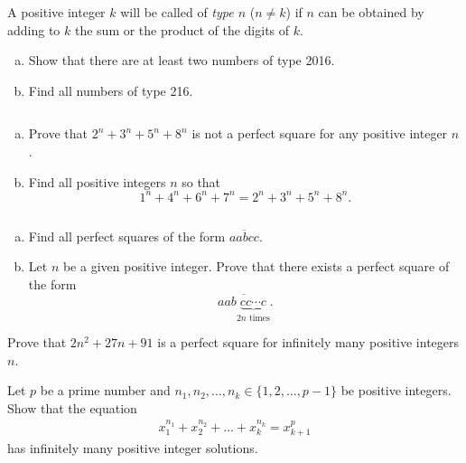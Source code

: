 \documentclass[problems.tex]{subfile}
\begin{document}
	
	\begin{problem}
		A positive integer $k$ will be called of \textit{type $n$} ($n \neq k$) if $n$ can be obtained by adding to $k$ the sum or the product of the digits of $k$.
		\begin{enumerate}[(a)]
			\item Show that there are at least two numbers of type 2016.
			\item  Find all numbers of type 216.
		\end{enumerate}
	\end{problem}
	
	
	\begin{problem}
		$ $
		\begin{enumerate}[(a)]
			\item Prove that $2^n+3^n+5^n+8^n$ is not a perfect square for any positive integer $n$.
			\item Find all positive integers $n$ so that $$1^n + 4^n + 6^n + 7^n = 2^n + 3^n + 5^n + 8^n.$$
		\end{enumerate}
	\end{problem}
	
	
	
	\begin{problem}
		$ $
		\begin{enumerate}[(a)]
			\item Find all perfect squares of the form $\overline{aabcc}$.
			\item Let $n$ be a given positive integer. Prove that there exists a perfect square of the form $$\overline{aab\underbrace{cc\cdots c}_{2n\text{ times}}}.$$
		\end{enumerate}
	\end{problem}
	
	
	
	\begin{problem}
		Prove that $2n^2 + 27n + 91$ is a perfect square for infinitely many positive integers $n$.
	\end{problem}
	
	
	\begin{problem}
		Let $p$ be a prime number and $n_1, n_2, \dots, n_k \in \{1, 2, \dots, p -1\}$ be positive integers. Show that the equation
		\begin{align*}
			x_1^{n_1} + x_2^{n_2} + \dots + x_k^{n_k} = x_{k+1}^p
		\end{align*}
		has infinitely many positive integer solutions.
	\end{problem}
	
\end{document}
